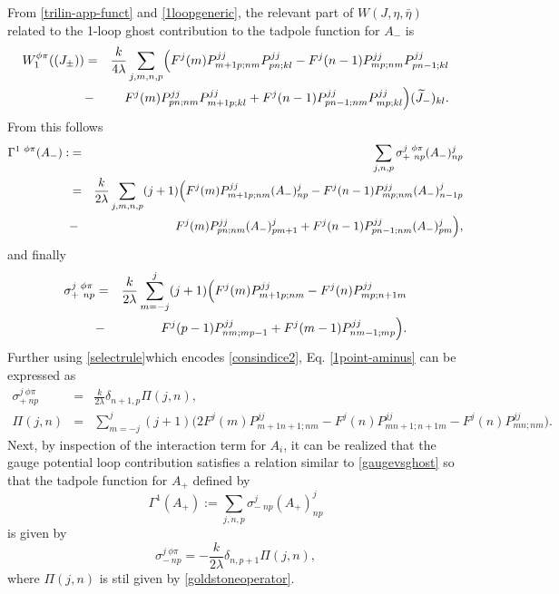 \documentclass[a4paper,11pt]{article}
\numberwithin{equation}{section}
\theoremstyle{nonumberplain}
\begin{document}
From \eqref{trilin-app-funct} and \eqref{1loopgeneric}, the relevant part of $W(J,\eta,\bar\eta)$ related to the 1-loop ghost contribution to the tadpole function for $A_-$ is
\begin{eqnarray}
W^{\phi\pi}_1((J_\pm))&=&\frac{k}{4\lambda}\sum_{j,m,n,p}\Bigl(F^j(m)P^{jj}_{m+1p;nm}P^{jj}_{pn;kl}-F^j(n-1)P^{jj}_{mp;nm}P^{jj}_{pn-1;kl}\nonumber\\ &-&F^j(m)P^{jj}_{pn;nm}P^{jj}_{m+1p;kl}+F^j(n-1)P^{jj}_{pn-1;nm}P^{jj}_{mp;kl}\Bigr)(\widetilde J_-)_{kl}.
\end{eqnarray}
From this follows
\begin{eqnarray}
\Gamma^{1\ \phi\pi}(A_-):&=&\sum_{j,n,p}\sigma^{j\ \phi\pi}_{+\ np}(A_-)^j_{np}\nonumber\\
&=&\frac{k}{2\lambda}\sum_{j,m,n,p}(j+1)\Bigl(F^j(m)P^{jj}_{m+1p;nm}(A_-)^j_{np}-F^j(n-1)P^{jj}_{mp;nm}(A_-)^j_{n-1p}\nonumber\\ &-&F^j(m)P^{jj}_{pn;nm}(A_-)^j_{pm+1}+F^j(n-1)P^{jj}_{pn-1;nm}(A_-)^j_{pm}\Bigr),
\end{eqnarray}
and finally
\begin{eqnarray}
\sigma^{j\ \phi\pi}_{+\ np}&=&\frac{k}{2\lambda}\sum_{m=-j}^j(j+1)\Bigl(F^j(m)P^{jj}_{m+1p;nm}-F^j(n)P^{jj}_{mp;n+1m}\nonumber\\
&-&F^j(p-1)P^{jj}_{nm;mp-1}+F^j(m-1)P^{jj}_{nm-1;mp}\Bigr)\label{1point-aminus}.
\end{eqnarray}
Further using \eqref{selectrule}which encodes \eqref{consindice2}, Eq. \eqref{1point-aminus} can be expressed as
\begin{eqnarray}
\sigma^{j\ \phi\pi}_{+\ np}&=&\frac{k}{2\lambda}\delta_{n+1,p}\Pi(j,n),\label{tadpole-aminus}\\
\Pi(j,n)&=&\sum_{m=-j}^j(j+1)\big(2F^j(m)P^{jj}_{m+1n+1;nm}-F^j(n)P^{jj}_{mn+1;n+1m}-F^j(n)P^{jj}_{mn;nm}\big)\label{goldstoneoperator}.
\end{eqnarray}
Next, by inspection of the interaction term for $A_i$, it can be realized that the gauge potential loop contribution satisfies a relation similar to \eqref{gaugevsghost} so that the tadpole function for $A_+$ defined by
\begin{equation}
\Gamma^{1}(A_+):=\sum_{j,n,p}\sigma^{j}_{-\ np}(A_+)^j_{np}
\end{equation}
is given by
\begin{equation}
\sigma^{j\ \phi\pi}_{-\ np}=-\frac{k}{2\lambda}\delta_{n,p+1}\Pi(j,n)\label{tadpole-aplus}, 
\end{equation}
where $\Pi(j,n)$ is stil given by \eqref{goldstoneoperator}.\par
\end{document}
